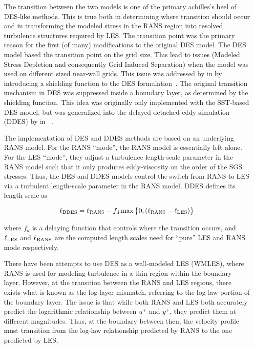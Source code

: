 \documentclass{ucb}
\newcommand{\RANS}{\textup{RANS}}
\newcommand{\LES}{\textup{LES}}
\newcommand{\DDES}{\textup{DDES}}
\begin{document}
The transition between the two models is one of the primary achilles's heel of DES-like methods. This is true both in determining where transition should occur and in transforming the modeled stress in the RANS region into resolved turbulence structures required by LES. The transition point was the primary reason for the first (of many) modifications to the original DES model. The DES model based the transition point on the grid size. This lead to issues (Modeled Stress Depletion and consequently Grid Induced Separation) when the model was used on different sized near-wall grids. This issue was addressed by \citeauthor{Menter2002} in  by introducing a shielding function to the DES formulation~\cite{Menter2002}. The original transition mechanism in DES was suppressed inside a boundary layer, as determined by the shielding function. This idea was originally only implemented with the SST-based DES model, but was generalized into the delayed detached eddy simulation (DDES) by \citeauthor{Spalart2006} in ~\cite{Spalart2006}. 

The implementation of DES and DDES methods are based on an underlying RANS model. For the RANS ``mode'', the RANS model is essentially left alone. For the LES ``mode'', they adjust a turbulence length-scale parameter in the RANS model such that it only produces eddy-viscosity on the order of the SGS stresses. Thus, the DES and DDES models control the switch from RANS to LES via a turbulent length-scale parameter in the RANS model. DDES defines its length scale as 

\begin{equation}\label{eq:ellDDES}
    \ell_{\DDES} = \ell_{\RANS} 
    - f_d \max \left \{ 0, \left(\ell_\RANS - \ell_\LES \right) \right\}
\end{equation}

where \(f_d \) is a delaying function that controls where the transition occurs, and \(\ell_\LES \) and \(\ell_\RANS \) are the computed length scales need for ``pure'' LES and RANS mode respectively.

There have been attempts to use DES as a wall-modeled LES (WMLES), where RANS is used for modeling turbulence in a thin region within the boundary layer. However, at the transition between the RANS and LES regions, there exists what is known as the log-layer mismatch, referring to the log-law portion of the boundary layer. The issue is that while both RANS and LES both accurately predict the logarithmic relationship between \(u^+\) and \(y^+\), they predict them at different magnitudes. Thus, at the boundary between then, the velocity profile must transition from the log-law relationship predicted by RANS to the one predicted by LES.
\end{document}
